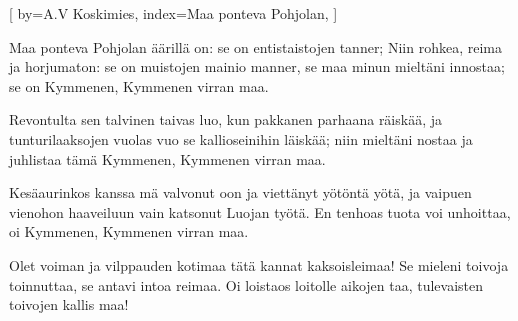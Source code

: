 

[
by={A.V Koskimies},
index={Maa ponteva Pohjolan},
]

\beginverse*
Maa ponteva Pohjolan äärillä on:
se on entistaistojen tanner;
Niin rohkea, reima ja horjumaton: 
se on muistojen mainio manner,
se maa minun mieltäni innostaa; 
se on Kymmenen, Kymmenen virran maa.
\endverse

\beginverse*
Revontulta sen talvinen taivas luo, 
kun pakkanen parhaana räiskää,
ja tunturilaaksojen vuolas vuo
se kallioseinihin läiskää;
niin mieltäni nostaa ja juhlistaa 
tämä Kymmenen, Kymmenen virran maa. 
\endverse

\beginverse* 
Kesäaurinkos kanssa mä valvonut oon ja 
viettänyt yötöntä yötä, ja vaipuen vienohon 
haaveiluun vain katsonut Luojan työtä. 
En tenhoas tuota voi unhoittaa, 
oi Kymmenen, Kymmenen virran maa. 
\endverse

\beginverse* 
Olet voiman ja vilppauden kotimaa 
tätä kannat kaksoisleimaa!
Se mieleni toivoja toinnuttaa, 
se antavi intoa reimaa. 
Oi loistaos loitolle aikojen taa, 
tulevaisten toivojen kallis maa! 
\endverse
\endsong


